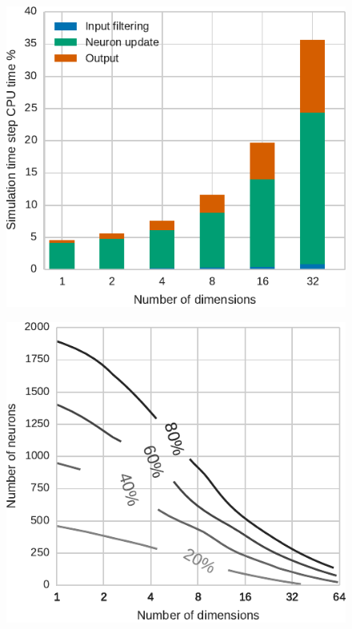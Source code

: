 \documentclass[conference]{IEEEtran}
\begin{document}
  \begin{figure}[!t]
    \includegraphics{figures/comm_channel_cpu_100n_bar}
    \caption{}
    \label{fig:results/comm-channel-cpu-100n}
  \end{figure}

  \begin{figure}[!t]
    \includegraphics{figures/comm_channel_cpu_contour}
    \caption{}
    \label{fig:results/comm-channel-cpu-contour}
  \end{figure}
  
\end{document}
